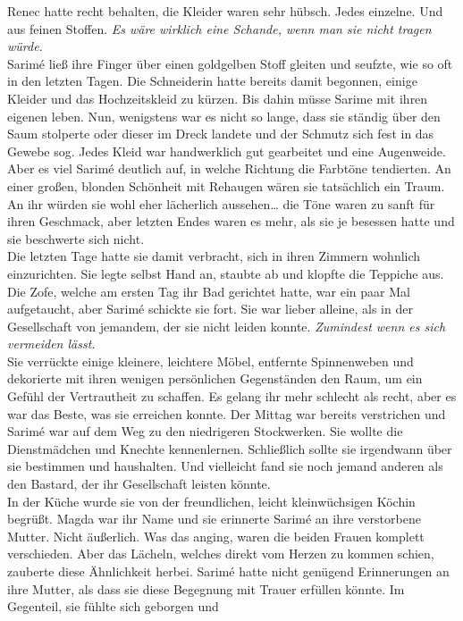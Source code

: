 Renec hatte recht behalten, die Kleider waren sehr hübsch. Jedes einzelne. Und aus feinen Stoffen.
\textit{Es wäre wirklich eine Schande, wenn man sie nicht tragen würde.} \\
Sarimé ließ ihre Finger über einen goldgelben Stoff gleiten und seufzte, wie so oft in den letzten 
Tagen. Die Schneiderin hatte bereits damit begonnen, einige Kleider und das Hochzeitskleid zu 
kürzen. Bis dahin müsse Sarime mit ihren eigenen leben. Nun, wenigstens war es nicht so lange, dass 
sie ständig über den Saum stolperte oder dieser im Dreck landete und der Schmutz sich fest in das 
Gewebe sog. Jedes Kleid war handwerklich gut gearbeitet und eine Augenweide. Aber es viel Sarimé 
deutlich auf, in welche Richtung die Farbtöne tendierten. An einer großen, blonden Schönheit mit 
Rehaugen wären sie tatsächlich ein Traum. An ihr würden sie wohl eher lächerlich aussehen… die Töne 
waren zu sanft für ihren Geschmack, aber letzten Endes waren es mehr, als sie je besessen hatte und 
sie beschwerte sich nicht.\\
Die letzten Tage hatte sie damit verbracht, sich in ihren Zimmern wohnlich einzurichten. Sie legte 
selbst Hand an, staubte ab und klopfte die Teppiche aus. Die Zofe, welche am ersten Tag ihr Bad 
gerichtet hatte, war ein paar Mal aufgetaucht, aber Sarimé schickte sie fort. Sie war lieber 
alleine, als in der Gesellschaft von jemandem, der sie nicht leiden konnte. \textit{Zumindest 
wenn es sich vermeiden lässt.}\\
Sie verrückte einige kleinere, leichtere Möbel, entfernte Spinnenweben und dekorierte mit ihren 
wenigen persönlichen Gegenständen den Raum, um ein Gefühl der Vertrautheit zu schaffen. Es gelang 
ihr mehr schlecht als recht, aber es war das Beste, was sie erreichen konnte. Der Mittag war 
bereits verstrichen und Sarimé war auf dem Weg zu den niedrigeren Stockwerken. Sie wollte die 
Dienstmädchen und Knechte kennenlernen. Schließlich sollte sie irgendwann über sie bestimmen und 
haushalten. Und vielleicht fand sie noch jemand anderen als den Bastard, der ihr Gesellschaft 
leisten könnte.\\
In der Küche wurde sie von der freundlichen, leicht kleinwüchsigen Köchin begrüßt. Magda war ihr 
Name und sie erinnerte Sarimé an ihre verstorbene Mutter. Nicht äußerlich. Was das anging, waren 
die beiden Frauen komplett verschieden. Aber das Lächeln, welches direkt vom Herzen zu kommen 
schien, zauberte diese Ähnlichkeit herbei. Sarimé hatte nicht genügend Erinnerungen an ihre Mutter, 
als dass sie diese Begegnung mit Trauer erfüllen könnte. Im Gegenteil, sie fühlte sich geborgen und 
